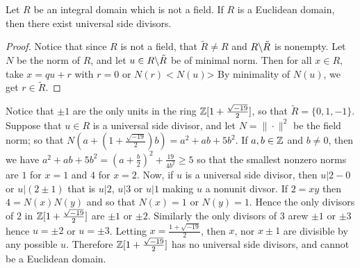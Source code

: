 \begin{proposition}\label{proposition_6.1.7}
  Let $R$ be an integral domain which is not a field. If $R$ is a Euclidean
  domain, then there exist universal side divisors.
\end{proposition}
\begin{proof}
  Notice that since $R$ is not a field, that $\tilde{R} \neq R$ and
  $R \backslash \tilde{R}$ is nonempty. Let $N$ be the norm of  $R$, and let  $u
  \in R \backslash \tilde{R}$ be of minimal norm. Then for all $x \in R$, take
  $x=qu+r$ with  $r=0$ or  $N(r)<N(u)$> By minimality of $N(u)$, we get $r \in
  \tilde{R}$.
\end{proof}

\begin{example}\label{example_6.3}
  Notice that $\pm 1$ are the only units in the ring
  $\mathbb{Z}[1+\frac{\sqrt{-19}}{2}]$, so that $\tilde{R}=\{0,1,-1\}$. Suppose that
  $u \in R$ is a universal side divisor, and let $N=\|\cdot\|^2$ be the field
  norm; so that $N(a+(1+\frac{\sqrt{-19}}{2})b)=a^2+ab+5b^2$. If $a,b \in \mathbb{Z}$
  and $b \neq 0$, then we have $a^2+ab+5b^2=(a+\frac{b}{2})^2+\frac{19}{4b^2}
  \geq 5$ so that the smallest nonzero norms are $1$ for $x=1$ and $4$ for $x=2$.
  Now, if $u$ is a universal side divisor, then  $u|2-0$ or  $u|(2 \pm 1)$
  that is $u|2$,  $u|3$ or  $u|1$ making  $u$ a nonunit divsor. If  $2=xy$
  then $4=N(x)N(y)$ and so that $N(x)=1$ or  $N(y)=1$. Hence the only
  divisors of $2$ in  $\mathbb{Z}[1+\frac{\sqrt{-19}}{2}]$ are $\pm 1$ or  $\pm 2$.
  Similarly the only divisors of  $3$ arew  $\pm 1$ or  $\pm 3$ hence  $u=\pm
  2$ or  $u=\pm 3$. Letting  $x=\frac{1+\sqrt{-19}}{2}$, then $x$, nor  $x
  \pm 1$ are divisible by any possible $u$. Therefore
  $\mathbb{Z}[1+\frac{\sqrt{-19}}{2}]$ has no universal side divisors, and cannot be a
  Euclidean domain.
\end{example}
